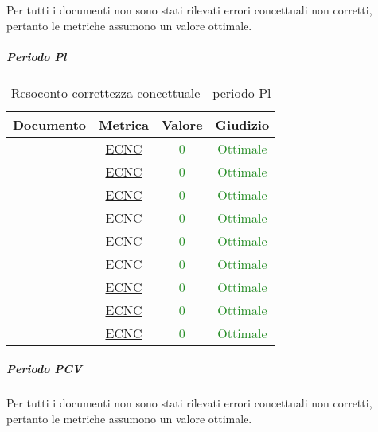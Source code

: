 							Per tutti i documenti non sono stati rilevati errori concettuali non corretti, pertanto le metriche assumono un valore ottimale.
							
							
							\subparagraph{Periodo Pl}
							
							\begin{table}[H]
								\centering
								\small
							\begin{tabular}{c | c | c | c}
								\hline
								\textbf{Documento} & \textbf{Metrica} & \textbf{Valore} & \textbf{Giudizio} \\
								\hline
								\pdpvdue  &     \hyperref[MCO]{ECNC} & \textcolor{ForestGreen}{0} & \textcolor{ForestGreen}{Ottimale} \\
								\pdqvdue  &      \hyperref[MCO]{ECNC} & \textcolor{ForestGreen}{0} & \textcolor{ForestGreen}{Ottimale} \\
								\ndpvdue   &   \hyperref[MCO]{ECNC} & \textcolor{ForestGreen}{0} & \textcolor{ForestGreen}{Ottimale} \\
								\adrvdue   &   \hyperref[MCO]{ECNC} & \textcolor{ForestGreen}{0} & \textcolor{ForestGreen}{Ottimale} \\
								\stvuno &	\hyperref[MCO]{ECNC} & \textcolor{ForestGreen}{0} & \textcolor{ForestGreen}{Ottimale} \\
								\glvdue &     \hyperref[MCO]{ECNC} & \textcolor{ForestGreen}{0} & \textcolor{ForestGreen}{Ottimale} \\
								\vcinquei&      \hyperref[MCO]{ECNC} & \textcolor{ForestGreen}{0} & \textcolor{ForestGreen}{Ottimale} \\
								\vseii   &  \hyperref[MCO]{ECNC} & \textcolor{ForestGreen}{0} & \textcolor{ForestGreen}{Ottimale} \\
								\vtree   &  \hyperref[MCO]{ECNC} & \textcolor{ForestGreen}{0} & \textcolor{ForestGreen}{Ottimale} \\
								\hline
							\end{tabular}
								\caption{Resoconto correttezza concettuale - periodo Pl}
								\label{tab_resoconto_correttezza_concettuale_PPL}
							\end{table}
							
							\subparagraph{Periodo PCV}
							Per tutti i documenti non sono stati rilevati errori concettuali non corretti, pertanto le metriche assumono un valore ottimale.
							
